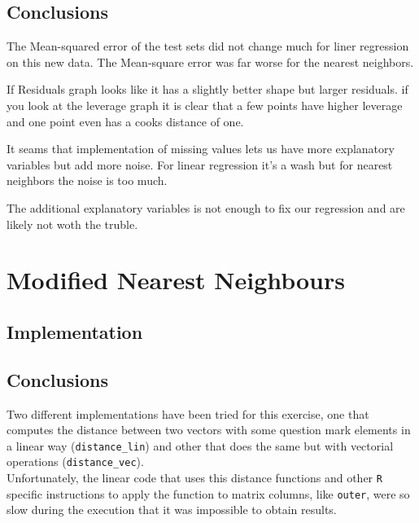 \documentclass[12pt,a4paper]{article}
\begin{document}
\begin{singlespace}
\subsection{Conclusions}
The Mean-squared error of the test sets did not change much for liner regression 
on this new data. The Mean-square error was far worse for the nearest neighbors.

If Residuals graph looks like it has a slightly better shape but larger residuals.
if you look at the leverage graph it is clear that a few points have higher 
leverage and one point even has a cooks distance of one.

It seams that implementation of missing values lets us have more 
explanatory variables but add more noise. For linear regression it's 
a wash but for nearest neighbors the noise is too much.

The additional explanatory variables is not enough to fix our regression
and are likely not woth the truble.



\section{Modified Nearest Neighbours}
\subsection{Implementation}


\vspace{-0.4cm}
\subsection{Conclusions}
Two different implementations have been tried for this exercise, one that computes the distance between two vectors with some question mark elements in a linear way (\texttt{distance\_lin}) and other that does the same but with vectorial operations (\texttt{distance\_vec}). \\

Unfortunately, the linear code that uses this distance functions and other \texttt{R} specific instructions to apply the function to matrix columns, like \texttt{outer}, were so slow during the execution that it was impossible to obtain results.

\end{singlespace}
\end{document}
